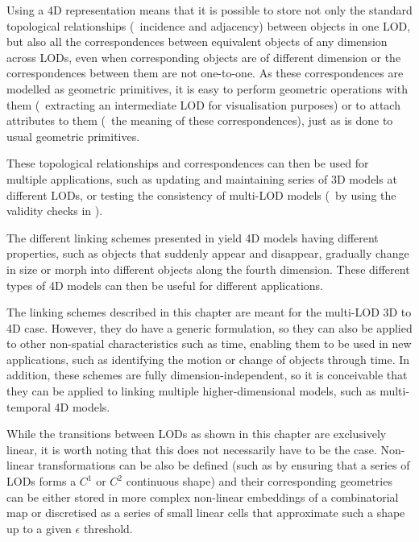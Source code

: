 Using a 4D representation means that it is possible to store not only the standard topological relationships (\eg\ incidence and adjacency) between objects in one LOD, but also all the correspondences between equivalent objects of any dimension across LODs, even when corresponding objects are of different dimension or the correspondences between them are not one-to-one.
As these correspondences are modelled as geometric primitives, it is easy to perform geometric operations with them (\eg\ extracting an intermediate LOD for visualisation purposes) or to attach attributes to them (\eg\ the meaning of these correspondences), just as is done to usual geometric primitives.

These topological relationships and correspondences can then be used for multiple applications, such as updating and maintaining series of 3D models at different LODs, or testing the consistency of multi-LOD models (\eg\ by using the validity checks in \citet{Groger11}).

The different linking schemes presented in  yield 4D models having different properties, such as objects that suddenly appear and disappear, gradually change in size or morph into different objects along the fourth dimension.
These different types of 4D models can then be useful for different applications.

The linking schemes described in this chapter are meant for the multi-LOD 3D to 4D case.
However, they do have a generic formulation, so they can also be applied to other non-spatial characteristics such as time, enabling them to be used in new applications, such as identifying the motion or change of objects through time.
In addition, these schemes are fully dimension-independent, so it is conceivable that they can be applied to linking multiple higher-dimensional models, such as multi-temporal 4D models.

While the transitions between LODs as shown in this chapter are exclusively linear, it is worth noting that this does not necessarily have to be the case.
Non-linear transformations can be also be defined (such as by ensuring that a series of LODs forms a $C^1$ or $C^2$ continuous shape) and their corresponding geometries can be either stored in more complex non-linear embeddings of a combinatorial map or discretised as a series of small linear cells that approximate such a shape up to a given $\epsilon$ threshold.
